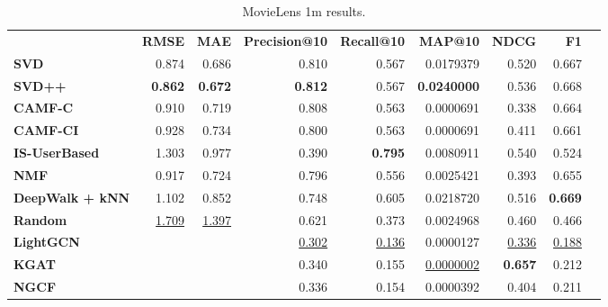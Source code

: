 \begin{table}[!htp]\centering
\caption{MovieLens 1m results.}\label{tab:ml1mtable}
\scriptsize
\begin{tabular}{lrrrrrrrr}\toprule
&\textbf{RMSE} &\textbf{MAE} &\textbf{Precision@10} &\textbf{Recall@10} &\textbf{MAP@10} &\textbf{NDCG} &\textbf{F1} \\\cmidrule{2-8}
\textbf{SVD} &0.874 &0.686 &0.810 &0.567 &0.0179379 &0.520 &0.667 \\\cmidrule{1-8}
\textbf{SVD++} &\textbf{0.862} &\textbf{0.672} &\textbf{0.812} &0.567 &\textbf{0.0240000} &0.536 &0.668 \\\cmidrule{1-8}
\textbf{CAMF-C} &0.910 &0.719 &0.808 &0.563 &0.0000691 &0.338 &0.664 \\\cmidrule{1-8}
\textbf{CAMF-CI} &0.928 &0.734 &0.800 &0.563 &0.0000691 &0.411 &0.661 \\\cmidrule{1-8}
\textbf{IS-UserBased} &1.303 &0.977 &0.390 &\textbf{0.795} &0.0080911 &0.540 &0.524 \\\cmidrule{1-8}
\textbf{NMF} &0.917 &0.724 &0.796 &0.556 &0.0025421 &0.393 &0.655 \\\cmidrule{1-8}
\textbf{DeepWalk + kNN} &1.102 &0.852 &0.748 &0.605 &0.0218720 &0.516 &\textbf{0.669} \\\cmidrule{1-8}
\textbf{Random} &\ul{1.709} &\ul{1.397} &0.621 &0.373 &0.0024968 &0.460 &0.466 \\\cmidrule{1-8}
\textbf{LightGCN} & & &\ul{0.302} &\ul{0.136} &0.0000127 &\ul{0.336} &\ul{0.188} \\\cmidrule{1-1}\cmidrule{1-8}
\textbf{KGAT} & & &0.340 &0.155 &\ul{0.0000002} &\textbf{0.657} &0.212 \\\midrule
\textbf{NGCF} & & &0.336 &0.154 &0.0000392 &0.404 &0.211 \\
\bottomrule
\end{tabular}
\end{table}